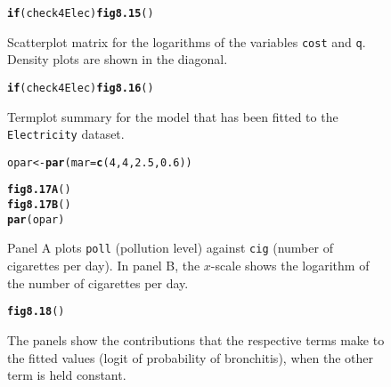 \documentclass[12pt, a4paper,  BCOR=8.25mm, DIV=15]{scrartcl}\usepackage[]{graphicx}\usepackage[]{color}
\makeatletter
\newcommand{\hlnum}[1]{\textcolor[rgb]{0.686,0.059,0.569}{#1}}%
\newcommand{\hlstd}[1]{\textcolor[rgb]{0.345,0.345,0.345}{#1}}%
\newcommand{\hlkwa}[1]{\textcolor[rgb]{0.161,0.373,0.58}{\textbf{#1}}}%
\newcommand{\hlkwb}[1]{\textcolor[rgb]{0.69,0.353,0.396}{#1}}%
\newcommand{\hlkwc}[1]{\textcolor[rgb]{0.333,0.667,0.333}{#1}}%
\newcommand{\hlkwd}[1]{\textcolor[rgb]{0.737,0.353,0.396}{\textbf{#1}}}%
\newenvironment{kframe}{%
 \def\at@end@of@kframe{}%
 \ifinner\ifhmode%
  \def\at@end@of@kframe{\end{minipage}}%
  \begin{minipage}{\columnwidth}%
 \fi\fi%
 \def\FrameCommand##1{\hskip\@totalleftmargin \hskip-\fboxsep
 \colorbox{shadecolor}{##1}\hskip-\fboxsep
     \hskip-\linewidth \hskip-\@totalleftmargin \hskip\columnwidth}%
 \MakeFramed {\advance\hsize-\width
   \@totalleftmargin\z@ \linewidth\hsize
   \@setminipage}}%
 {\par\unskip\endMakeFramed%
 \at@end@of@kframe}
\newenvironment{knitrout}{}{} %
\newcommand{\txtt}[1]{{\texttt{#1}}}
\makeatother
\begin{document}
\begin{figure}[H]
\begin{knitrout}
\color{fgcolor}\begin{kframe}
\begin{alltt}
\hlkwa{if}\hlstd{(check4Elec)}\hlkwd{fig8.15}\hlstd{()}
\end{alltt}
\end{kframe}
\end{knitrout}
  \caption{Scatterplot matrix for the logarithms of the variables
    \txtt{cost} and \txtt{q}. Density plots are shown in the
    diagonal.\label{fig:elec-dens}}
\end{figure}



\begin{figure}[H]
\begin{knitrout}
\color{fgcolor}\begin{kframe}
\begin{alltt}
\hlkwa{if}\hlstd{(check4Elec)}\hlkwd{fig8.16}\hlstd{()}
\end{alltt}
\end{kframe}
\end{knitrout}
\caption{Termplot summary for the model that has been fitted to the
  \texttt{Electricity} dataset.\label{fig:elec-log-tplot}}
\end{figure}



\begin{figure}[H]
\begin{knitrout}
\color{fgcolor}\begin{kframe}
\begin{alltt}
\hlstd{opar} \hlkwb{<-} \hlkwd{par}\hlstd{(}\hlkwc{mar}\hlstd{=}\hlkwd{c}\hlstd{(}\hlnum{4}\hlstd{,}\hlnum{4}\hlstd{,}\hlnum{2.5}\hlstd{,}\hlnum{0.6}\hlstd{))}

\hlkwd{fig8.17A}\hlstd{()}
\hlkwd{fig8.17B}\hlstd{()}
\hlkwd{par}\hlstd{(opar)}
\end{alltt}
\end{kframe}
\end{knitrout}
\caption{Panel A plots \txtt{poll} (pollution level) against
  \txtt{cig} (number of cigarettes per day).  In panel B, the
  $x$-scale shows the logarithm of the number of cigarettes per
  day.\label{fig:cig-poll}}
\end{figure}



\begin{figure}[H]
\begin{knitrout}
\color{fgcolor}\begin{kframe}
\begin{alltt}
\hlkwd{fig8.18}\hlstd{()}
\end{alltt}
\end{kframe}
\end{knitrout}
\caption{The panels show the contributions that the respective terms
  make to the fitted values (logit of probability of bronchitis), when
  the other term is held constant.\label{fig:xy-cig}}
\end{figure}
\end{document}
